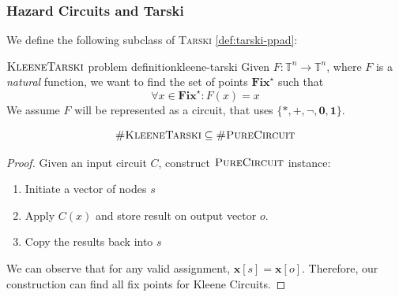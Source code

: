 %
%
%

\subsubsection{Hazard Circuits and Tarski}
We define the following subclass of \textsc{Tarski} \ref{def:tarski-ppad}:


\begin{definitionbox}{$\textnormal{\textsc{KleeneTarski}}$ problem definition}{kleene-tarski}
    Given $F: \mathbb{T}^n \to \mathbb{T}^n$, where $F$ is a \textit{natural} function,
    we want to find the set of points $\textbf{Fix}^\star$ such that
    $$
        \forall x \in \textbf{Fix}^\star: F(x)  = x
    $$
    We assume $F$ will be represented as a circuit, that uses
    $\{*, +, \neg, \mathbf{0}, \mathbf{1}\}$.
\end{definitionbox}


\begin{proposition}
    $$
    \textnormal{\textsc{\#KleeneTarski}} \subseteq \textnormal{\textsc{\#PureCircuit}}
    $$
\end{proposition}

\begin{proof}
Given an input circuit $C$, construct $\textsc{PureCircuit}$ instance:
\begin{enumerate}
    \item Initiate a vector of nodes $s$
    \item Apply $C(x)$ and store result on output vector $o$.
    \item Copy the results back into $s$
\end{enumerate}

We can observe that for any valid assignment, $\mathbf{x}[s]= \mathbf{x}[o]$.
Therefore, our construction can find all fix points for Kleene Circuits.
\end{proof}

